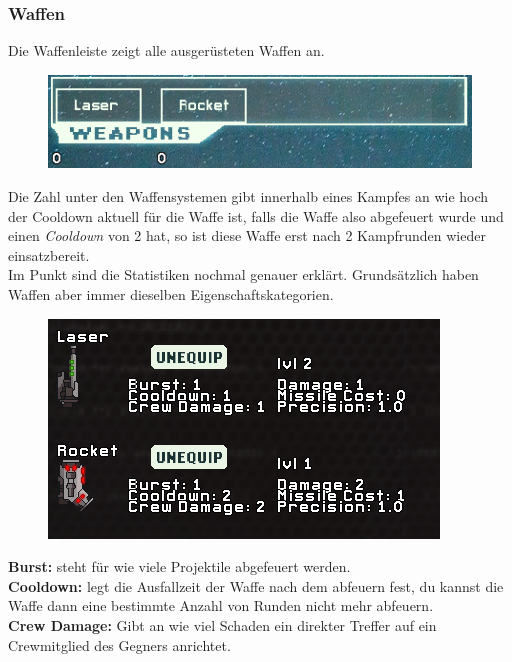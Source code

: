 \documentclass[fontsize=12pt,paper=a4,twoside]{scrartcl}
\begin{document}
\subsubsection{Waffen}
Die Waffenleiste zeigt alle ausgerüsteten Waffen an.

\begin{figure}[H]
\centering
\includegraphics[width=0.7\linewidth]{DasSpiel/Ui/weapons.png}
\end{figure} 
Die Zahl unter den Waffensystemen gibt innerhalb eines Kampfes an wie hoch der Cooldown aktuell für die Waffe ist, falls die Waffe also abgefeuert wurde und einen \textit{Cooldown} von 2 hat, so ist diese Waffe erst nach 2 Kampfrunden wieder einsatzbereit.
\\

Im Punkt  sind die Statistiken nochmal genauer erklärt. Grundsätzlich haben Waffen aber immer dieselben Eigenschaftskategorien.
\begin{figure}[H]
\centering
\includegraphics[width=0.8\linewidth]{DasSpiel/Ui/Weapon_Stats.png}
\end{figure} 

\textbf{Burst:} steht für wie viele Projektile abgefeuert werden.
\\

\textbf{Cooldown:} legt die Ausfallzeit der Waffe nach dem abfeuern fest, du kannst die Waffe dann eine bestimmte Anzahl von Runden nicht mehr abfeuern.
\\

\textbf{Crew Damage:} Gibt an wie viel Schaden ein direkter Treffer 
auf ein Crewmitglied des Gegners anrichtet.
\\
\end{document}
